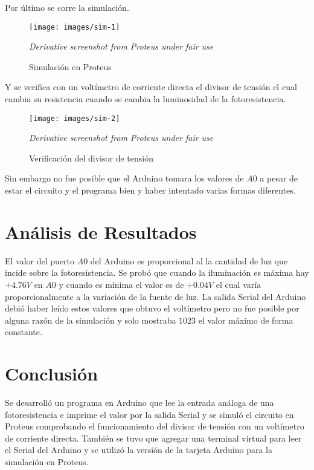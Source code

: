 \documentclass{article}
\begin{document}
Por último se corre la simulación.

\begin{figure}[H]
\centering
\texttt{[image: images/sim-1]}
\caption{Simulación en Proteus}\footnotesize
\textit{Derivative screenshot from Proteus under fair use}
\end{figure}

Y se verifica con un voltímetro de corriente directa el divisor de tensión el
cual cambia su resistencia cuando se cambia la luminosidad de la
fotoresistencia.

\begin{figure}[H]
\centering
\texttt{[image: images/sim-2]}
\caption{Verificación del divisor de tensión}\footnotesize
\textit{Derivative screenshot from Proteus under fair use}
\end{figure}

Sin embargo no fue posible que el Arduino tomara los valores de $A0$ a pesar
de estar el circuito y el programa bien y haber intentado varias formas
diferentes.

\section{Análisis de Resultados}

El valor del puerto $A0$ del Arduino es proporcional al la cantidad de luz
que incide sobre la fotoresistencia. Se probó que cuando la iluminación es
máxima hay $+4.76V$ en $A0$ y cuando es mínima el valor es de $+0.04V$ el
cual varía proporcionalmente a la variación de la fuente de luz. La salida
Serial del Arduino debió haber leído estos valores que obtuvo el voltímetro
pero no fue posible por alguna razón de la simulación y solo mostraba $1023$
el valor máximo de forma constante.

\section{Conclusión}

Se desarrolló un programa en Arduino que lee la entrada análoga de una
fotoresistencia e imprime el valor por la salida Serial y se simuló el
circuito en Proteus comprobando el funcionamiento del divisor de tensión con
un voltímetro de corriente directa. También se tuvo que agregar una terminal
virtual para leer el Serial del Arduino y se utilizó la versión
 de la tarjeta Arduino para la simulación en Proteus.

\printbibliography
\end{document}
